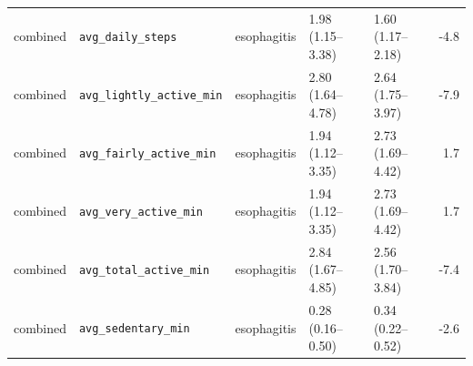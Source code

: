 \documentclass[11pt]{article}
\newcommand{\code}[1]{\texttt{\small #1}}
\begin{document}
\begin{longtable}{@{}p{1.7cm}p{3.0cm}p{1.9cm}p{2.6cm}p{2.6cm}r@{}}
combined & \code{avg\_daily\_steps} & esophagitis & 1.98 (1.15--3.38) & 1.60 (1.17--2.18) & -4.8 \\
combined & \code{avg\_lightly\_active\_min} & esophagitis & 2.80 (1.64--4.78) & 2.64 (1.75--3.97) & -7.9 \\
combined & \code{avg\_fairly\_active\_min} & esophagitis & 1.94 (1.12--3.35) & 2.73 (1.69--4.42) & 1.7 \\
combined & \code{avg\_very\_active\_min} & esophagitis & 1.94 (1.12--3.35) & 2.73 (1.69--4.42) & 1.7 \\
combined & \code{avg\_total\_active\_min} & esophagitis & 2.84 (1.67--4.85) & 2.56 (1.70--3.84) & -7.4 \\
combined & \code{avg\_sedentary\_min} & esophagitis & 0.28 (0.16--0.50) & 0.34 (0.22--0.52) & -2.6 \\
\bottomrule \end{longtable}\normalsize
\end{document}
